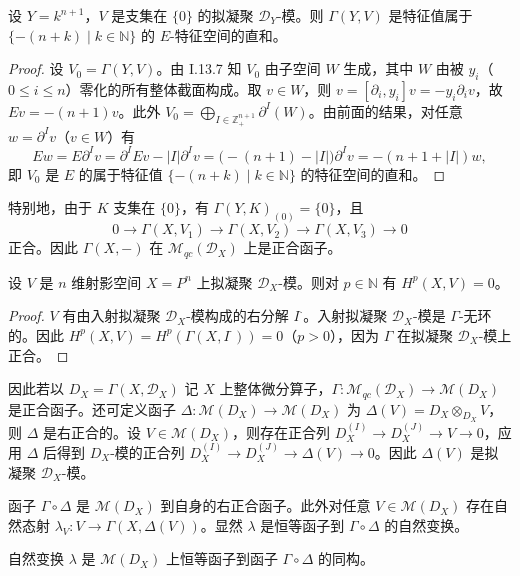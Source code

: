 \begin{lemma}
设 $Y=k^{n+1}$，$V$ 是支集在 $\{0\}$ 的拟凝聚 $\mathcal{D}_Y$-模。则 $\Gamma(Y,V)$ 是特征值属于 $\{-(n+k)\mid k\in\mathbb{N}\}$ 的 $E$-特征空间的直和。
\end{lemma}

\begin{proof}
设 $V_0=\Gamma(Y,V)$。由 I.13.7 知 $V_0$ 由子空间 $W$ 生成，其中 $W$ 由被 $y_i$（$0\le i\le n$）零化的所有整体截面构成。取 $v\in W$，则 $v=[\partial_i,y_i]v=-y_i\partial_iv$，故 $Ev=-(n+1)v$。此外 $V_0=\bigoplus_{I\in\mathbb{Z}_+^{n+1}}\partial^I(W)$。由前面的结果，对任意 $w=\partial^Iv$（$v\in W$）有
$$Ew=E\partial^Iv=\partial^IEv-|I|\partial^Iv=\bigl(-(n+1)-|I|\bigr)\partial^Iv=-(n+1+|I|)w,$$
即 $V_0$ 是 $E$ 的属于特征值 $\{-(n+k)\mid k\in\mathbb{N}\}$ 的特征空间的直和。
\end{proof}

特别地，由于 $K$ 支集在 $\{0\}$，有 $\Gamma(Y,K)_{(0)}=\{0\}$，且
$$0\longrightarrow\Gamma(X,V_1)\longrightarrow\Gamma(X,V_2)\longrightarrow\Gamma(X,V_3)\longrightarrow 0$$
正合。因此 $\Gamma(X,-)$ 在 $\mathcal{M}_{qc}(\mathcal{D}_X)$ 上是正合函子。

\begin{theorem}
设 $V$ 是 $n$ 维射影空间 $X=P^n$ 上拟凝聚 $\mathcal{D}_X$-模。则对 $p\in\mathbb{N}$ 有 $H^p(X,V)=0$。
\end{theorem}

\begin{proof}
$V$ 有由入射拟凝聚 $\mathcal{D}_X$-模构成的右分解 $I^\cdot$。入射拟凝聚 $\mathcal{D}_X$-模是 $\Gamma$-无环的。因此 $H^p(X,V)=H^p(\Gamma(X,I^\cdot))=0$（$p>0$），因为 $\Gamma$ 在拟凝聚 $\mathcal{D}_X$-模上正合。
\end{proof}

因此若以 $D_X=\Gamma(X,\mathcal{D}_X)$ 记 $X$ 上整体微分算子，$\Gamma:\mathcal{M}_{qc}(\mathcal{D}_X)\to\mathcal{M}(D_X)$ 是正合函子。还可定义函子 $\Delta:\mathcal{M}(D_X)\to\mathcal{M}(D_X)$ 为 $\Delta(V)=D_X\otimes_{D_X}V$，则 $\Delta$ 是右正合的。设 $V\in\mathcal{M}(D_X)$，则存在正合列 $D_X^{(I)}\to D_X^{(J)}\to V\to 0$，应用 $\Delta$ 后得到 $D_X$-模的正合列 $D_X^{(I)}\to D_X^{(J)}\to\Delta(V)\to 0$。因此 $\Delta(V)$ 是拟凝聚 $\mathcal{D}_X$-模。

函子 $\Gamma\circ\Delta$ 是 $\mathcal{M}(D_X)$ 到自身的右正合函子。此外对任意 $V\in\mathcal{M}(D_X)$ 存在自然态射 $\lambda_V:V\to\Gamma(X,\Delta(V))$。显然 $\lambda$ 是恒等函子到 $\Gamma\circ\Delta$ 的自然变换。

\begin{lemma}
自然变换 $\lambda$ 是 $\mathcal{M}(D_X)$ 上恒等函子到函子 $\Gamma\circ\Delta$ 的同构。
\end{lemma}

